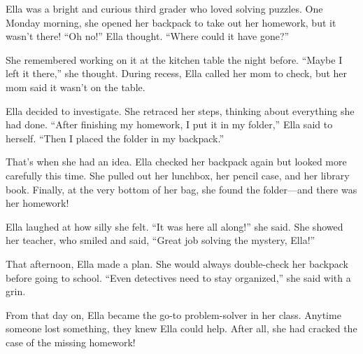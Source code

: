 \documentclass[12pt]{article}
\begin{document}
\begin{tcolorbox}[colframe=black!60, colback=white, 
coltitle=black, colbacktitle=black!15, fonttitle=\bfseries\Large, 
title=Text: The Mystery of the Missing Homework, halign title=center, left=10pt, right=10pt, top=10pt, bottom=15pt]
Ella was a bright and curious third grader who loved solving puzzles. One Monday morning, she opened her backpack to take out her homework, but it wasn’t there! “Oh no!” Ella thought. “Where could it have gone?”

She remembered working on it at the kitchen table the night before. “Maybe I left it there,” she thought. During recess, Ella called her mom to check, but her mom said it wasn’t on the table.

Ella decided to investigate. She retraced her steps, thinking about everything she had done. “After finishing my homework, I put it in my folder,” Ella said to herself. “Then I placed the folder in my backpack.”

That’s when she had an idea. Ella checked her backpack again but looked more carefully this time. She pulled out her lunchbox, her pencil case, and her library book. Finally, at the very bottom of her bag, she found the folder—and there was her homework!

Ella laughed at how silly she felt. “It was here all along!” she said. She showed her teacher, who smiled and said, “Great job solving the mystery, Ella!”

That afternoon, Ella made a plan. She would always double-check her backpack before going to school. “Even detectives need to stay organized,” she said with a grin.

From that day on, Ella became the go-to problem-solver in her class. Anytime someone lost something, they knew Ella could help. After all, she had cracked the case of the missing homework!

 


 

     \end{tcolorbox}
\end{document}
